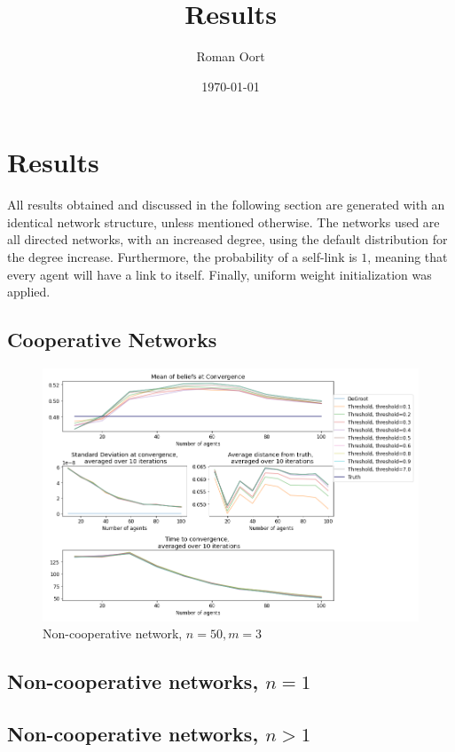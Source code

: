 \documentclass{article}
\title{Results}
\author{Roman Oort}
\date{\today}
\begin{document}
\maketitle

\tableofcontents
\newpage
\section{Results}

All results obtained and discussed in the following section are generated with an identical network structure, unless mentioned otherwise. The networks used are all directed networks, with an increased degree, using the default distribution for the degree increase. Furthermore, the probability of a self-link is $1$, meaning that every agent will have a link to itself. Finally, uniform weight initialization was applied.

\subsection{Cooperative Networks}

\begin{center}
    \begin{figure}[!htbp]
        \centering
        \includegraphics[width=1\textwidth]{ThesisKI/Images/WisdomCompare.png}
        \caption{Non-cooperative network, $n=50, m=3$}
        \label{network:noncoop}
    \end{figure}
\end{center}

\subsection{Non-cooperative networks, $n=1$}

\subsection{Non-cooperative networks, $n > 1$}
\end{document}
